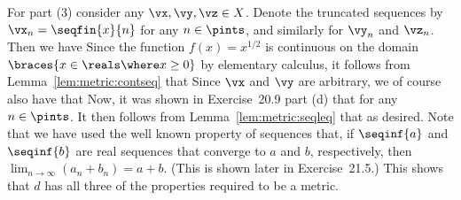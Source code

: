 {{    For part (3) consider any $\vx,\vy,\vz \in X$.
    Denote the truncated sequences by $\vx_n = \seqfin{x}{n}$ for any $n \in \pints$, and similarly for $\vy_n$ and $\vz_n$.
    Then we have
    Since the function $f(x) = x^{1/2}$ is continuous on the domain $\braces{x \in \reals \where x \geq 0}$ by elementary calculus, it follows from Lemma~\ref{lem:metric:contseq} that
    Since $\vx$ and $\vy$ are arbitrary, we of course also have that
    Now, it was shown in Exercise~20.9 part (d) that
    for any $n \in \pints$.
    It then follows from Lemma~\ref{lem:metric:seqleq} that
    as desired.
    Note that we have used the well known property of sequences that, if $\seqinf{a}$ and $\seqinf{b}$ are real sequences that converge to $a$ and $b$, respectively, then $\lim_{n \to \infty} (a_n + b_n) = a + b$. (This is shown later in Exercise~21.5.)
    This shows that $d$ has all three of the properties required to be a metric.
  }
}

